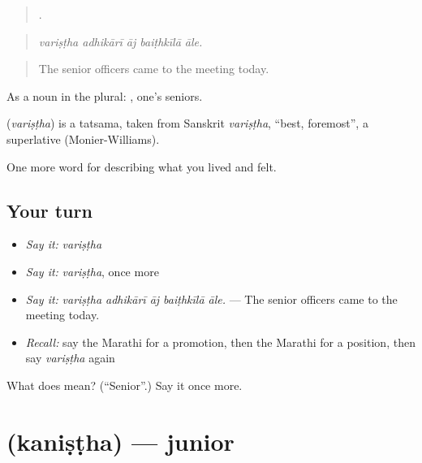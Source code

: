 \begin{quote}
    .
\end{quote}

\begin{quote}
\emph{variṣṭha adhikārī āj baiṭhkīlā āle.}
\end{quote}

\begin{quote}
The senior officers came to the meeting today.
\end{quote}

As a noun in the plural: , one's seniors.

\begin{cousinweb}
\textbf{} (\emph{variṣṭha}) is a tatsama, taken from Sanskrit \emph{variṣṭha}, \textquotedblleft{}best, foremost\textquotedblright{}, a superlative (Monier-Williams).
\end{cousinweb}

\begin{grammarlens}[title={What you've built}]
One more word for describing what you lived and felt.
\end{grammarlens}

\subsection*{Your turn}
\begin{itemize}
\raggedright
  \item \emph{Say it:} \emph{variṣṭha}
  \item \emph{Say it:} \emph{variṣṭha}, once more
  \item \emph{Say it:} \emph{variṣṭha adhikārī āj baiṭhkīlā āle.} — The senior officers came to the meeting today.
  \item \emph{Recall:} say the Marathi for a promotion, then the Marathi for a position, then say \emph{variṣṭha} again
\end{itemize}

\begin{tcolorbox}[breakable,colback=teal!4,colframe=teal!35!black,title={Before you move on}]
What does  mean? (\textquotedblleft{}Senior\textquotedblright{}.) Say it once more.
\end{tcolorbox}
\section[\texorpdfstring{\mr{कनिष्ठ} (kaniṣṭha)}{कनिष्ठ (kaniṣṭha)}]{ (kaniṣṭha) — junior}

